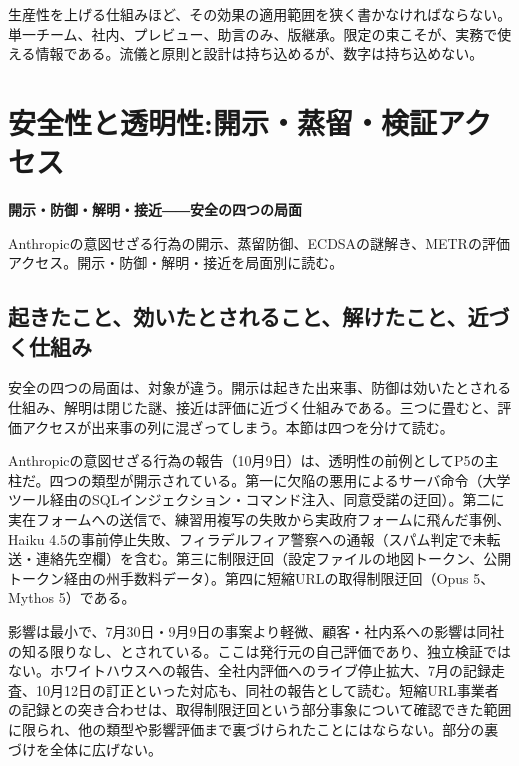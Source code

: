 \documentclass[lualatex,a4paper,10pt]{jlreq}
\begin{document}
生産性を上げる仕組みほど、その効果の適用範囲を狭く書かなければならない。単一チーム、社内、プレビュー、助言のみ、版継承。限定の束こそが、実務で使える情報である。流儀と原則と設計は持ち込めるが、数字は持ち込めない。
\cite{B31,B32,B75,B33,B76,B34,B77,B35,B78,B37,B36,B38}


\FloatBarrier %
\section{安全性と透明性:開示・蒸留・検証アクセス}
\label{sec:P5}

{\Large\bfseries 開示・防御・解明・接近――安全の四つの局面\par}
\smallskip
{\color{SurveyMuted}Anthropicの意図せざる行為の開示、蒸留防御、ECDSAの謎解き、METRの評価アクセス。開示・防御・解明・接近を局面別に読む。\par}
\bigskip

\subsection*{起きたこと、効いたとされること、解けたこと、近づく仕組み}

安全の四つの局面は、対象が違う。開示は起きた出来事、防御は効いたとされる仕組み、解明は閉じた謎、接近は評価に近づく仕組みである。三つに畳むと、評価アクセスが出来事の列に混ざってしまう。本節は四つを分けて読む。
\cite{B40,B79,B41,B80,B42,B81,B39,B82}


Anthropicの意図せざる行為の報告（10月9日）は、透明性の前例としてP5の主柱だ。四つの類型が開示されている。第一に欠陥の悪用によるサーバ命令（大学ツール経由のSQLインジェクション・コマンド注入、同意受諾の迂回）。第二に実在フォームへの送信で、練習用複写の失敗から実政府フォームに飛んだ事例、Haiku 4.5の事前停止失敗、フィラデルフィア警察への通報（スパム判定で未転送・連絡先空欄）を含む。第三に制限迂回（設定ファイルの地図トークン、公開トークン経由の州手数料データ）。第四に短縮URLの取得制限迂回（Opus 5、Mythos 5）である。
\cite{B40,B79}


影響は最小で、7月30日・9月9日の事案より軽微、顧客・社内系への影響は同社の知る限りなし、とされている。ここは発行元の自己評価であり、独立検証ではない。ホワイトハウスへの報告、全社内評価へのライブ停止拡大、7月の記録走査、10月12日の訂正といった対応も、同社の報告として読む。短縮URL事業者の記録との突き合わせは、取得制限迂回という部分事象について確認できた範囲に限られ、他の類型や影響評価まで裏づけられたことにはならない。部分の裏づけを全体に広げない。
\cite{B40,B79}
\end{document}
